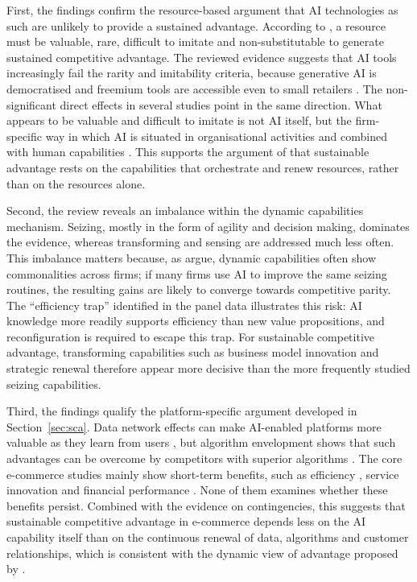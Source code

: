 First, the findings confirm the resource-based argument that AI technologies as such are unlikely to provide a sustained advantage. According to \textcite[99]{barney1991}, a resource must be valuable, rare, difficult to imitate and non-substitutable to generate sustained competitive advantage. The reviewed evidence suggests that AI tools increasingly fail the rarity and imitability criteria, because generative AI is democratised \parencite[583]{cui2024} and freemium tools are accessible even to small retailers \parencite[76]{slrR193}. The non-significant direct effects in several studies point in the same direction. What appears to be valuable and difficult to imitate is not AI itself, but the firm-specific way in which AI is situated in organisational activities \parencite[618]{slrR087} and combined with human capabilities \parencite[1425]{krakowski2023}. This supports the argument of \textcite[1319]{teece2007} that sustainable advantage rests on the capabilities that orchestrate and renew resources, rather than on the resources alone.

Second, the review reveals an imbalance within the dynamic capabilities mechanism. Seizing, mostly in the form of agility and decision making, dominates the evidence, whereas transforming and sensing are addressed much less often. This imbalance matters because, as \textcite[1105]{eisenhardt2000} argue, dynamic capabilities often show commonalities across firms; if many firms use AI to improve the same seizing routines, the resulting gains are likely to converge towards competitive parity. The \enquote{efficiency trap} identified in the panel data \parencite[1]{huang2026} illustrates this risk: AI knowledge more readily supports efficiency than new value propositions, and reconfiguration is required to escape this trap. For sustainable competitive advantage, transforming capabilities such as business model innovation \parencites[574]{sjodin2021}[1]{slrR037} and strategic renewal \parencite[1242]{slrR085} therefore appear more decisive than the more frequently studied seizing capabilities.

Third, the findings qualify the platform-specific argument developed in Section~\ref{sec:sca}. Data network effects can make AI-enabled platforms more valuable as they learn from users \parencite[534]{gregory2021}, but algorithm envelopment shows that such advantages can be overcome by competitors with superior algorithms \parencite[187]{chen2026}. The core e-commerce studies mainly show short-term benefits, such as efficiency \parencites[290]{slrR241}[76]{slrR193}, service innovation \parencite[1]{slrR111} and financial performance \parencite[93]{slrR219}. None of them examines whether these benefits persist. Combined with the evidence on contingencies, this suggests that sustainable competitive advantage in e-commerce depends less on the AI capability itself than on the continuous renewal of data, algorithms and customer relationships, which is consistent with the dynamic view of advantage proposed by \textcite[509]{teece1997}.


